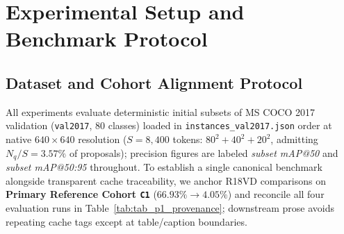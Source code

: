 \documentclass[preprint,10pt]{elsarticle}
\begin{document}
\section{Experimental Setup and Benchmark Protocol}
\label{sec:experimental_setup}

\subsection{Dataset and Cohort Alignment Protocol}
All experiments evaluate deterministic initial subsets of MS COCO 2017 validation (\texttt{val2017}, 80 classes) \citep{lin2014microsoft} loaded in \texttt{instances\_val2017.json} order at native $640 \times 640$ resolution ($S = 8,400$ tokens: $80^2 + 40^2 + 20^2$, admitting $N_q / S = 3.57\%$ of proposals); precision figures are labeled \textit{subset mAP@50} and \textit{subset mAP@50:95} throughout. To establish a single canonical benchmark alongside transparent cache traceability, we anchor R18VD comparisons on \textbf{Primary Reference Cohort \texttt{C1}} ($66.93\% \to 4.05\%$) and reconcile all four evaluation runs in Table~\ref{tab:tab_p1_provenance}; downstream prose avoids repeating cache tags except at table/caption boundaries.
\end{document}
